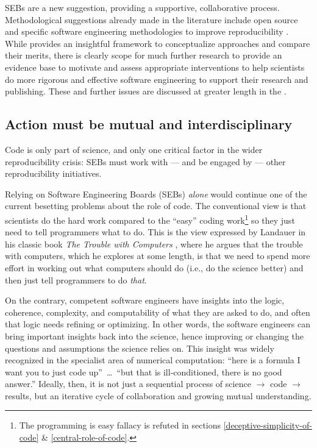 \documentclass{comjnl}
\begin{document}
SEBs are a new suggestion, providing a supportive, collaborative process. Methodological suggestions already made in the literature include open source and specific software engineering methodologies to improve reproducibility \cite{basic-reproducibilty,open-source}. While \cite{ABCs-SE} provides an insightful framework to conceptualize approaches and compare their merits, there is clearly scope for much further research to provide an evidence base to motivate and assess appropriate interventions to help scientists do more rigorous and effective software engineering to support their research and publishing. These and further issues are discussed at greater length in the \supplement. 

\begin{change}
\subsection{Action must be mutual and interdisciplinary}
\setcounter{footnote}{1}
Code is only part of science, and only one critical factor in the wider reproducibility crisis: SEBs must work with --- and be engaged by --- other reproducibility initiatives.
 
Relying on Software Engineering Boards (SEBs) \emph{alone\/} would continue one of the current besetting problems about the role of code. The conventional view is that scientists do the hard work compared to the ``easy'' coding work\footnote{The programming is easy fallacy is refuted in sections \ref{deceptive-simplicity-of-code} \& \ref{central-role-of-code}.} so they just need to tell programmers what to do. This is the view expressed by Landauer in his classic book \emph{The Trouble with Computers\/} \cite{landauer,thimbleby-landauer}, where he argues that the trouble with computers, which he explores at some length, is that we need to spend more effort in working out what computers should do (i.e., do the science better) and then just tell programmers to do \emph{that}.  

On the contrary, competent software engineers have insights into the logic, coherence, complexity, and computability of what they are asked to do, and often that logic needs refining or optimizing. In other words, the software engineers can bring important insights back into the science, hence improving or changing the questions and assumptions the science relies on. This insight was widely recognized in the specialist area of numerical computation: ``here is a formula I want you to just code up''~\ldots\ ``but that is ill-conditioned, there is no good answer.'' Ideally, then, it is not just a sequential process of science $\rightarrow$ code $\rightarrow$ results, but an iterative cycle of collaboration and growing mutual understanding.


\end{change}
\end{document}
